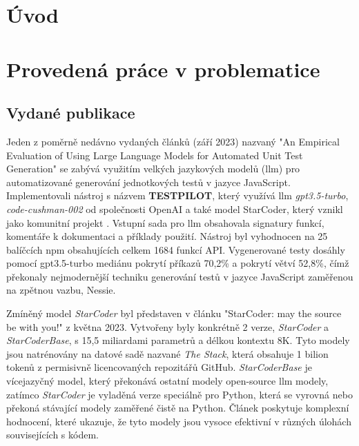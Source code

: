 \documentclass[12pt]{article}
\begin{document}
    \newpage
    \section{Úvod}

    \newpage
    \section{Provedená práce v problematice} \label{sec:previouswork}
    
        \subsection{Vydané publikace}
        Jeden z poměrně nedávno vydaných článků (září 2023) nazvaný "An Empirical Evaluation of Using Large Language Models for Automated Unit Test Generation" \cite{schafer2023empirical} se zabývá využitím velkých jazykových modelů (\gls{llm}) pro automatizované generování jednotkových testů v jazyce JavaScript. Implementovali nástroj s názvem \textbf{TESTPILOT}, který využívá \gls{llm} \textit{gpt3.5-turbo}, \textit{code-cushman-002} od společnosti OpenAI a  také model StarCoder, který vznikl jako komunitní projekt \cite{StarCoder2023}. Vstupní sada pro \gls{llm} obsahovala signatury funkcí, komentáře k dokumentaci a příklady použití. Nástroj byl vyhodnocen na 25 balíčcích npm obsahujících celkem 1684 funkcí API. Vygenerované testy dosáhly pomocí gpt3.5-turbo mediánu pokrytí příkazů 70,2\% a pokrytí větví 52,8\%, čímž překonaly nejmodernější techniku generování testů v jazyce JavaScript zaměřenou na zpětnou vazbu, Nessie.

        Zmíněný model \emph{StarCoder} byl představen v článku "StarCoder: may the source be with you!" \cite{StarCoder2023} z května 2023. Vytvořeny byly konkrétně 2 verze, \textit{StarCoder} a \textit{StarCoderBase}, s 15,5 miliardami parametrů a délkou kontextu 8K. Tyto modely jsou natrénovány na datové sadě nazvané \textit{The Stack}, která obsahuje 1 bilion tokenů z permisivně licencovaných repozitářů GitHub. \textit{StarCoderBase} je vícejazyčný model, který překonává ostatní modely open-source \gls{llm} modely, zatímco \textit{StarCoder} je vyladěná verze speciálně pro Python, která se vyrovná nebo překoná stávající modely zaměřené čistě na Python. Článek poskytuje komplexní hodnocení, které ukazuje, že tyto modely jsou vysoce efektivní v různých úlohách souvisejících s kódem.
\end{document}
